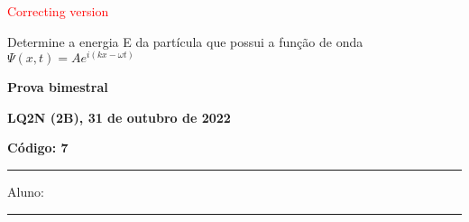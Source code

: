 \documentclass[12pt, addpoints]{exam}
\begin{document}
        \begin{center}
\textcolor{red}{\emph\Large Correcting version}\end{center}
\begin{questions}
\begin{multicols*}{2}
\question[20] Determine a energia E da partícula que possui a função de onda $\Psi(x,t)=Ae^{i(kx-\omega t)}$

\begin{oneparchoices}
\end{oneparchoices}
\end{multicols*}
\end{questions}
\newpage
        \begin{minipage}[b]{0.75\linewidth}
            \begin{flushleft}
                {\bf \large Prova bimestral}
            \end{flushleft}
            \begin{flushleft}
                {\bf \large LQ2N (2B), 31 de outubro de 2022}
            \end{flushleft}
        \end{minipage}
        \begin{minipage}[b]{0.20\linewidth}
            \begin{flushright}
                {\bf \large Código: 7}
            \end{flushright}
        \end{minipage}
        \vspace{0.5cm} \hrule \vspace{0.5cm}
        \begin{minipage}{0.75\linewidth}
            Aluno:
        \end{minipage}
        \vspace{0.5cm} \hrule \vspace{0.5cm}
\end{document}
